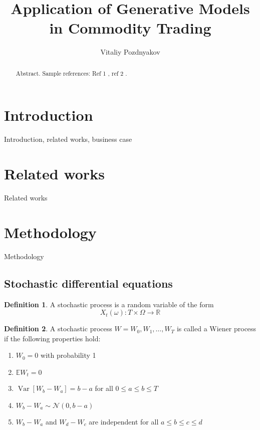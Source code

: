 \documentclass{article}
\title{Application of Generative Models \\ in Commodity Trading}
\author{Vitaliy Pozdnyakov}
\date{}
\theoremstyle{definition}
\newtheorem{definition}{Definition}[section]
\DeclareMathOperator{\Var}{Var}
\begin{document}
\maketitle

\begin{abstract}
    Abstract. Sample references: Ref 1 \cite{renscen}, ref 2 \citet{jebara}.
\end{abstract}

\section{Introduction}
Introduction, related works, business case

\section{Related works}
Related works

\section{Methodology}
Methodology

\subsection{Stochastic differential equations}

\theoremstyle{definition}
\begin{definition}
    A stochastic process is a random variable of the form
    $$X_t(\omega): T \times \Omega \to \mathbb R$$
\end{definition}

\begin{definition}
    A stochastic process $W = W_0, W_1, \dots, W_T$ is called a Wiener process if the following properties hold:
    \begin{enumerate}
        \item $W_0 = 0$ with probability 1
        \item $\mathbb E W_t = 0$
        \item $\Var[W_b - W_a] = b - a$ for all $0\leq a \leq b \leq T$
        \item $W_b - W_a \sim \mathcal N (0, b-a)$
        \item $W_b - W_a$ and $W_d - W_c$ are independent for all $a \leq b \leq c \leq d$
    \end{enumerate}
\end{definition}
\end{document}
